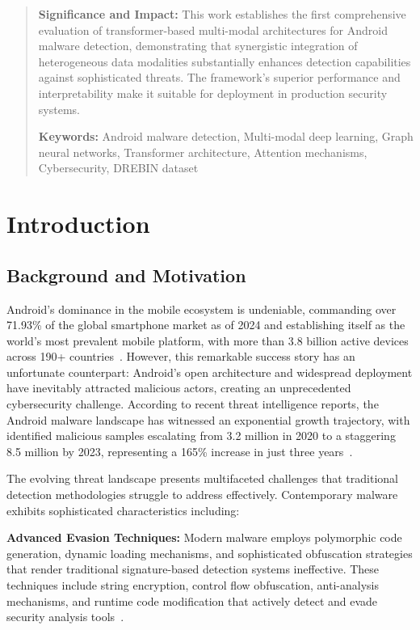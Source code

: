 \documentclass[a4paper,11pt]{article}
\begin{document}
\begin{abstract}
\textbf{Significance and Impact:} This work establishes the first comprehensive evaluation of transformer-based multi-modal architectures for Android malware detection, demonstrating that synergistic integration of heterogeneous data modalities substantially enhances detection capabilities against sophisticated threats. The framework's superior performance and interpretability make it suitable for deployment in production security systems.

\textbf{Keywords:} Android malware detection, Multi-modal deep learning, Graph neural networks, Transformer architecture, Attention mechanisms, Cybersecurity, DREBIN dataset

\end{abstract}

\newpage
\twocolumn

\section{Introduction}

\subsection{Background and Motivation}

Android's dominance in the mobile ecosystem is undeniable, commanding over 71.93\% of the global smartphone market as of 2024 and establishing itself as the world's most prevalent mobile platform, with more than 3.8 billion active devices across 190+ countries~\cite{AndroidMarketShare2024}. However, this remarkable success story has an unfortunate counterpart: Android's open architecture and widespread deployment have inevitably attracted malicious actors, creating an unprecedented cybersecurity challenge. According to recent threat intelligence reports, the Android malware landscape has witnessed an exponential growth trajectory, with identified malicious samples escalating from 3.2 million in 2020 to a staggering 8.5 million by 2023, representing a 165\% increase in just three years~\cite{AVTestReport2023, MalwareStatistics2023}.

The evolving threat landscape presents multifaceted challenges that traditional detection methodologies struggle to address effectively. Contemporary malware exhibits sophisticated characteristics including:

\textbf{Advanced Evasion Techniques:} Modern malware employs polymorphic code generation, dynamic loading mechanisms, and sophisticated obfuscation strategies that render traditional signature-based detection systems ineffective. These techniques include string encryption, control flow obfuscation, anti-analysis mechanisms, and runtime code modification that actively detect and evade security analysis tools~\cite{ObfuscationTechniques2023}.
\end{document}
